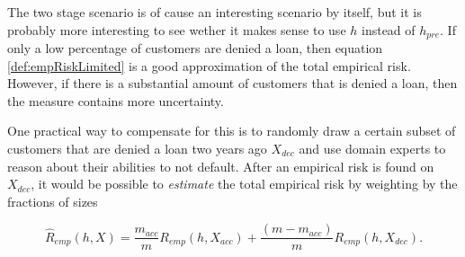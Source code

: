 \documentclass{article}
\theoremstyle{theorem}
\theoremstyle{definition}
\begin{document}
The two stage scenario is of cause an interesting scenario by itself, but it is probably more interesting to see wether it makes sense to use $h$ instead of $h_{pre}$.  If only a low percentage of customers are denied a loan, then equation \eqref{def:empRiskLimited} is a good approximation of the total empirical risk.  However, if there is a substantial amount of customers that is denied a loan, then the measure contains more uncertainty. 

One practical way to compensate for this is to randomly draw a certain subset of customers that are denied a loan two years ago $X_{dec}$ and use domain experts to reason about their abilities to not default.  After an empirical risk is found on $X_{dec}$, it would be possible to \emph{estimate} the total empirical risk by weighting by the fractions of sizes 

\begin{equation}
\label{def:empRiskTotal}
\hat{R}_{emp}(h, X) = \frac{m_{acc}}{m}R_{emp}(h, X_{acc})  +  \frac{(m - m_{acc})}{m}R_{emp}(h, X_{dec}).
\end{equation}
\end{document}
